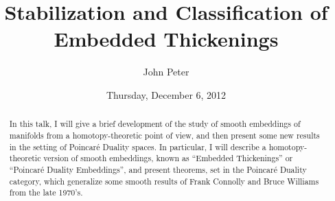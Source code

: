 \documentclass{UAmathtalk}
\author{John Peter}
\title{Stabilization and Classification of Embedded Thickenings}
\date{Thursday, December 6, 2012}
\begin{document}
\maketitle

\begin{abstract}
In this talk, I will give a brief development of the study of smooth embeddings of manifolds from a homotopy-theoretic point of view, and then present some new results in the setting of Poincar\'e Duality spaces. In particular, I will describe a homotopy-theoretic version of smooth embeddings, known as ``Embedded Thickenings'' or ``Poincar\'e Duality Embeddings'', and present theorems, set in the Poincar\'e Duality category, which generalize some smooth results of Frank Connolly and Bruce Williams from the late 1970's.
\end{abstract}
\end{document}

